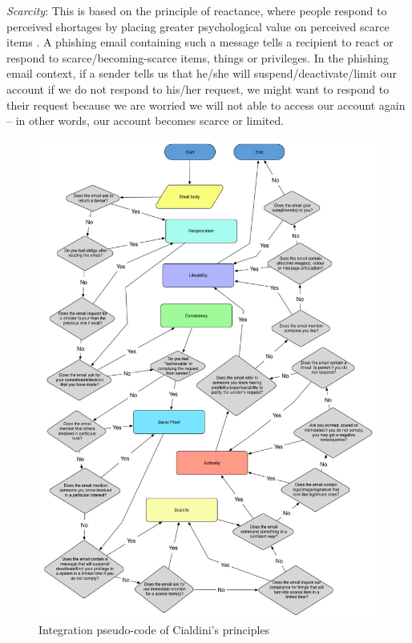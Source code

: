 \emph{Scarcity}: This is based on the principle of reactance, where
people respond to perceived shortages by placing greater psychological
value on perceived scarce items \cite{workman:2008}. A phishing email
containing such a message tells a recipient to react or respond to
scarce/becoming-scarce items, things or privileges. In the phishing
email context, if a sender tells us that he/she will suspend/deactivate/limit
our account if we do not respond to his/her request, we might want
to respond to their request because we are worried we will not able
to access our account again -- in other words, our account becomes
scarce or limited.

\begin{figure}[H]
\begin{centering}
\includegraphics[scale=0.4]{gfx/pseudo-cialdini-2}
\par\end{centering}

\protect\caption{\label{fig:Flowchart-cialdini}Integration pseudo-code of Cialdini's
principles}
\end{figure}


